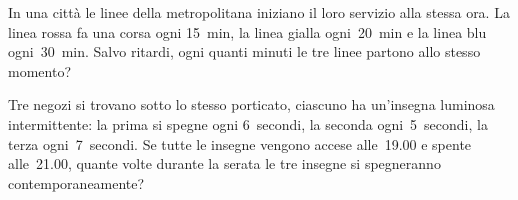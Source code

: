 \begin{multicols}{2}

% 

\begin{esercizio}
In una città le linee della metropolitana iniziano il loro servizio alla 
stessa 
ora. La linea rossa fa una corsa ogni 15~min, la linea gialla ogni~20~min 
e la linea blu ogni~30~min. Salvo ritardi, ogni quanti minuti le tre linee
partono allo stesso momento?
\end{esercizio}

\begin{esercizio}
 Tre negozi si trovano sotto lo stesso porticato, ciascuno ha un'insegna 
luminosa intermittente: la prima si spegne ogni
6~secondi, la seconda ogni~5~secondi, la terza ogni~7~secondi. Se tutte le 
insegne vengono accese alle~19.00 e spente alle~21.00, quante 
volte durante la serata le tre insegne si spegneranno contemporaneamente?
\end{esercizio}


\end{multicols}
